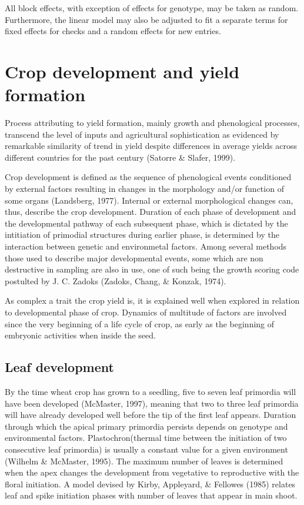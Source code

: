 \documentclass[12pt,oneside]{dukestatscithesis} %
\begin{document}
All block effects, with exception of effects for genotype, may be taken as random. Furthermore, the linear model may also be adjusted to fit a separate terms for fixed effects for checks and a random effects for new entries.

\hypertarget{crop-development-and-yield-formation}{%
\section{Crop development and yield formation}\label{crop-development-and-yield-formation}}

Process attributing to yield formation, mainly growth and phenological processes, transcend the level of inputs and agricultural sophistication as evidenced by remarkable similarity of trend in yield despite differences in average yields across different countries for the past century (Satorre \& Slafer, 1999).

Crop development is defined as the sequence of phenological events conditioned by external factors resulting in changes in the morphology and/or function of some organs (Landsberg, 1977). Internal or external morphological changes can, thus, describe the crop development. Duration of each phase of development and the developmental pathway of each subsequent phase, which is dictated by the intitiation of primodial structures during earlier phase, is determined by the interaction between genetic and environmetal factors. Among several methods those used to describe major developmental events, some which are non destructive in sampling are also in use, one of such being the growth scoring code postulted by J. C. Zadoks (Zadoks, Chang, \& Konzak, 1974).

As complex a trait the crop yield is, it is explained well when explored in relation to developmental phase of crop. Dynamics of multitude of factors are involved since the very beginning of a life cycle of crop, as early as the beginning of embryonic activities when inside the seed.

\hypertarget{leaf-development}{%
\subsection{Leaf development}\label{leaf-development}}

By the time wheat crop has grown to a seedling, five to seven leaf primordia will have been developed (McMaster, 1997), meaning that two to three leaf primordia will have already developed well before the tip of the first leaf appears. Duration through which the apical primary primordia persists depends on genotype and environmental factors. Plastochron(thermal time between the initiation of two consecutive leaf primordia) is usually a constant value for a given environment (Wilhelm \& McMaster, 1995). The maximum number of leaves is determined when the apex changes the development from vegetative to reproductive with the floral initiation. A model devised by Kirby, Appleyard, \& Fellowes (1985) relates leaf and spike initiation phases with number of leaves that appear in main shoot.
\end{document}
